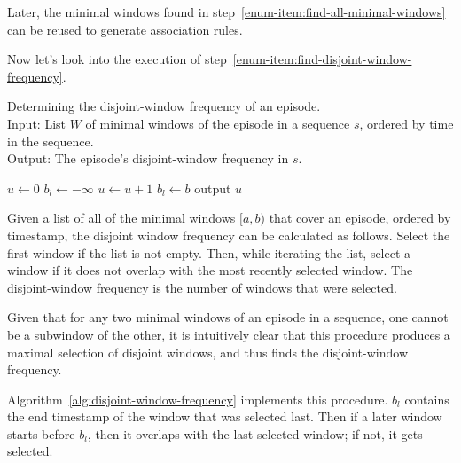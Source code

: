 Later, the minimal windows found in step~\ref{enum-item:find-all-minimal-windows} can be reused to generate association rules.

Now let's look into the execution of step~\ref{enum-item:find-disjoint-window-frequency}.

\begin{algorithm}

\caption{Determining the disjoint-window frequency of an episode.\\
Input: List $ W $ of minimal windows of the episode in a sequence $ s $, ordered by time in the sequence.\\
Output: The episode's disjoint-window frequency in $ s $.
}

\begin{algorithmic}[1]

\State $ u \gets 0 $
\State $ b_l \gets -\infty $
\ForAll {$ [a, b) \in W $}
        \State $ u \gets u + 1 $
        \State $ b_l \gets b $
    \EndIf
\EndFor
\State output $ u $

\end{algorithmic}

\label{alg:disjoint-window-frequency}
\end{algorithm}

Given a list of all of the minimal windows $ [a, b) $ that cover an episode, ordered by timestamp, the disjoint window frequency can be calculated as follows. Select the first window if the list is not empty. Then, while iterating the list, select a window if it does not overlap with the most recently selected window. The disjoint-window frequency is the number of windows that were selected.

Given that for any two minimal windows of an episode in a sequence, one cannot be a subwindow of the other, it is intuitively clear that this procedure produces a maximal selection of disjoint windows, and thus finds the disjoint-window frequency.

Algorithm~\ref{alg:disjoint-window-frequency} implements this procedure. $ b_l $ contains the end timestamp of the window that was selected last. Then if a later window starts before $ b_l $, then it overlaps with the last selected window; if not, it gets selected.

